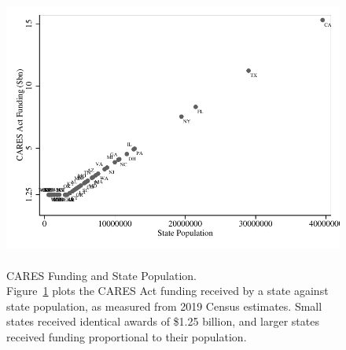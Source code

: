 \begin{center}
\begin{figure}[!ht]
	\centering
	\caption{\\ CARES Funding and State Population. \\
	{\small Figure~\ref{figure:cares_formula} plots the CARES Act funding received by a state against state population, as measured from 2019 Census estimates. Small states received identical awards of \$1.25 billion, and larger states received funding proportional to their population.}}
	\includegraphics[scale=1.1]{../output/appendix/figures/cares_formula.pdf}
	
	\label{figure:cares_formula}
\end{figure}
\end{center}




\clearpage

